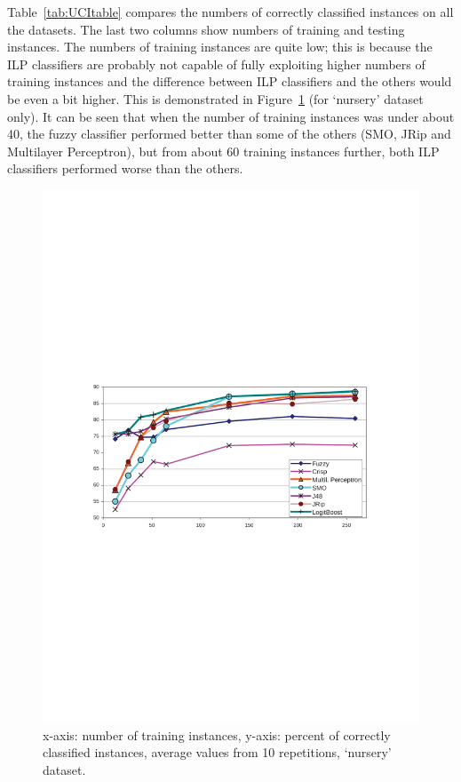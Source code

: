 Table~\ref{tab:UCItable} compares the numbers of correctly classified instances on all the datasets. The last two columns show numbers of training and testing instances. The numbers of training instances are quite low; this is because the ILP classifiers are probably not capable of fully exploiting higher numbers of training instances and the difference between ILP classifiers and the others would be even a bit higher. This is demonstrated in Figure~\ref{fig:corect_growing_learninig_instances} (for `nursery' dataset only). It can be seen that when the number of training instances was under about 40, the fuzzy classifier performed better than some of the others (SMO, JRip and Multilayer Perceptron), but from about 60 training instances further, both ILP classifiers performed worse than the others.


\begin{figure}
\centerline{\includegraphics[width=0.8\hsize]{corect_growing_learninig_instances}}
\caption{x-axis: number of training instances, y-axis: percent of correctly classified instances, average values from 10 repetitions, `nursery' dataset.}
\label{fig:corect_growing_learninig_instances}
\end{figure}


